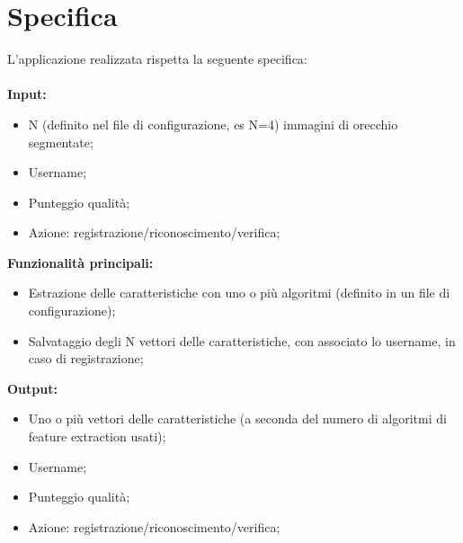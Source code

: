 \chapter{Specifica}
L'applicazione realizzata rispetta la seguente specifica:\\\\
\textbf{Input:}
\begin{itemize}
	\item N (definito nel file di configurazione, es N=4) immagini di orecchio segmentate;
	\item Username;
	\item Punteggio qualità;
	\item Azione: registrazione/riconoscimento/verifica;
\end{itemize}
\textbf{Funzionalità principali:}
\begin{itemize}
	\item Estrazione delle caratteristiche con uno o più algoritmi (definito in un file di configurazione);
	\item Salvataggio degli N vettori delle caratteristiche, con associato lo username, in caso di registrazione;
\end{itemize}
\textbf{Output:}
\begin{itemize}
	\item Uno o più vettori delle caratteristiche (a seconda del numero di algoritmi di feature extraction usati);
	\item Username;
	\item Punteggio qualità;
	\item Azione: registrazione/riconoscimento/verifica;
\end{itemize}